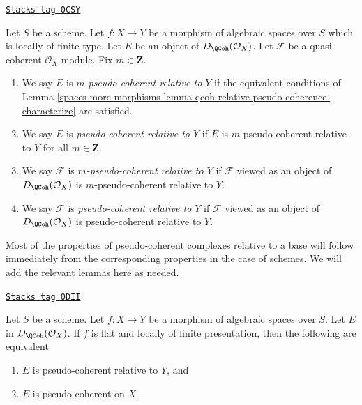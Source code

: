 \begin{definition}
\label{spaces-more-morphisms-definition-relative-pseudo-coherence}
\href{https://stacks.math.columbia.edu/tag/0CSY}{\texttt{Stacks tag 0CSY}}

Let $S$ be a scheme. Let $f : X \to Y$ be a morphism of
algebraic spaces over $S$ which is locally of finite type.
Let $E$ be an object of $D_\QCoh(\mathcal{O}_X)$. Let $\mathcal{F}$ be a
quasi-coherent $\mathcal{O}_X$-module. Fix $m \in \mathbf{Z}$.
\begin{enumerate}
\item We say $E$ is {\it $m$-pseudo-coherent relative to $Y$}
if the equivalent conditions of
Lemma \ref{spaces-more-morphisms-lemma-qcoh-relative-pseudo-coherence-characterize} are satisfied.
\item We say $E$ is {\it pseudo-coherent relative to $Y$}
if $E$ is $m$-pseudo-coherent relative to $Y$ for all $m \in \mathbf{Z}$.
\item We say $\mathcal{F}$ is {\it $m$-pseudo-coherent relative to $Y$} if
$\mathcal{F}$ viewed as an object of $D_\QCoh(\mathcal{O}_X)$ is
$m$-pseudo-coherent relative to $Y$.
\item We say $\mathcal{F}$ is {\it pseudo-coherent relative to $Y$} if
$\mathcal{F}$ viewed as an object of $D_\QCoh(\mathcal{O}_X)$ is
pseudo-coherent relative to $Y$.
\end{enumerate}
\end{definition}

Most of the properties of pseudo-coherent complexes relative to a base
will follow immediately from the corresponding properties in the case
of schemes. We will add the relevant lemmas here as needed.

\begin{lemma}
\label{spaces-more-morphisms-lemma-relative-pseudo-coherent-is-moot}
\href{https://stacks.math.columbia.edu/tag/0DII}{\texttt{Stacks tag 0DII}}

Let $S$ be a scheme. Let $f : X \to Y$ be a morphism of
algebraic spaces over $S$. Let $E$ in $D_\QCoh(\mathcal{O}_X)$.
If $f$ is flat and locally of finite presentation, then
the following are equivalent
\begin{enumerate}
\item $E$ is pseudo-coherent relative to $Y$, and
\item $E$ is pseudo-coherent on $X$.
\end{enumerate}
\end{lemma}

